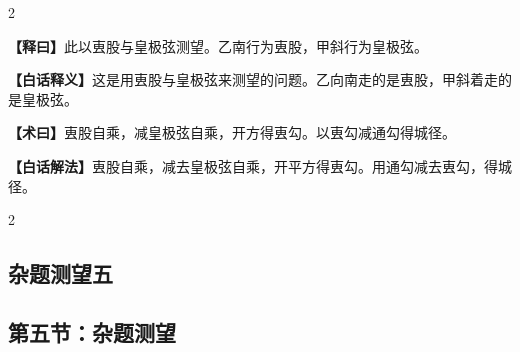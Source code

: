 \documentclass[11pt,a4paper]{article}
\newcommand{\WenExplain}{\textcolor{classicalcolor}{\textbf{【释曰】}}}
\newcommand{\BaiExplain}{\textcolor{moderncolor}{\textbf{【白话释义】}}}
\newcommand{\WenMethod}{\textcolor{classicalcolor}{\textbf{【术曰】}}}
\newcommand{\BaiMethod}{\textcolor{moderncolor}{\textbf{【白话解法】}}}
\begin{document}
\begin{paracol}{2}
\switchcolumn*
\begin{tcolorbox}[colback=red!5,colframe=red!30!black,boxrule=0.3pt]
\WenExplain\quad 此以叀股与皇极弦测望。乙南行为叀股，甲斜行为皇极弦。
\end{tcolorbox}
\switchcolumn
\begin{tcolorbox}[colback=blue!5,colframe=blue!30!black,boxrule=0.3pt]
\BaiExplain\quad 这是用叀股与皇极弦来测望的问题。乙向南走的是叀股，甲斜着走的是皇极弦。
\end{tcolorbox}

\switchcolumn*
\begin{tcolorbox}[colback=red!5,colframe=red!40!black,boxrule=0.3pt]
\WenMethod\quad 叀股自乘，减皇极弦自乘，开方得叀勾。以叀勾减通勾得城径。
\end{tcolorbox}
\switchcolumn
\begin{tcolorbox}[colback=blue!5,colframe=blue!40!black,boxrule=0.3pt]
\BaiMethod\quad 叀股自乘，减去皇极弦自乘，开平方得叀勾。用通勾减去叀勾，得城径。
\end{tcolorbox}

\end{paracol}

\vspace{0.5em}

\begin{paracol}{2}
\subsection*{\textcolor{sectioncolor}{杂题测望五}}
\switchcolumn
\subsection*{\textcolor{sectioncolor}{第五节：杂题测望}}
\end{paracol}

\vspace{0.5em}
\end{document}
